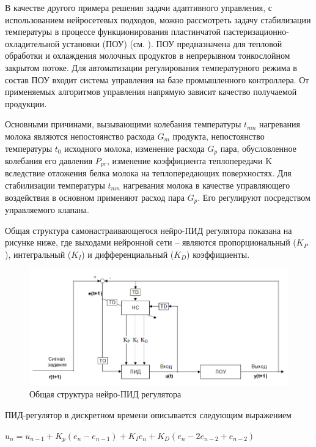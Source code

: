 В качестве другого примера решения задачи адаптивного управления, с использованием нейросетевых подходов, можно рассмотреть задачу стабилизации температуры в процессе функционирования пластинчатой пастеризационно-охладительной установки (ПОУ) (см. ). ПОУ предназначена  для  тепловой  обработки  и  охлаждения  молочных продуктов  в  непрерывном  тонкослойном  закрытом  потоке. Для  автоматизации  регулирования  температурного  режима  в  состав  ПОУ входит  система  управления  на  базе  промышленного  контроллера. От  применяемых  алгоритмов  управления  напрямую  зависит  качество получаемой продукции.

Основными  причинами,  вызывающими  колебания  температуры $t_{mn}$ нагревания молока являются непостоянство расхода $G_m$ продукта, непостоянство температуры $t_0$ исходного молока, изменение расхода $G_p$  пара,  обусловленное  колебания  его  давления $P_{pr}$, изменение коэффициента теплопередачи K вследствие отложения белка молока на теплопередающих поверхностях. Для стабилизации температуры $t_{mn}$ нагревания молока в качестве управляющего воздействия в основном применяют расход пара $G_p$. Его регулируют посредством управляемого клапана.

Общая структура самонастраивающегося  нейро-ПИД  регулятора  показана  на  рисунке ниже, где выходами нейронной сети – являются пропорциональный ($K_P$), интегральный ($K_I$) и дифференциальный ($K_D$) коэффициенты.

\begin{figure}[H]
	\includegraphics[scale=0.8]{images/part7/chapter_enterprise/neuropid.png}
	\caption{Общая структура  нейро-ПИД  регулятора}
	\label{fig:neuropid}
\end{figure}


ПИД-регулятор в дискретном времени описывается следующим выражением

$u_n = u_{n-1} + K_p (e_n - e_{n-1}) + K_I e_n + K_D (e_n - 2e_{n-2}+ e_{n-2} )$

